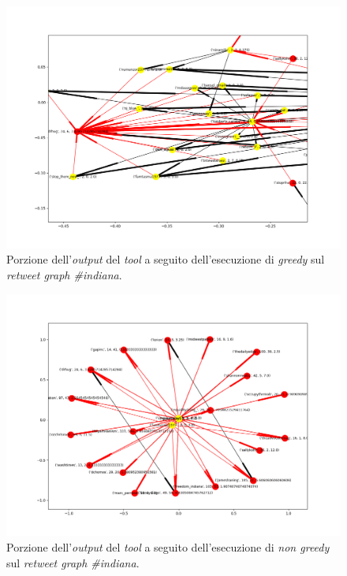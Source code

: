 \begin{figure}
\begin{center}
\includegraphics[scale=0.5]{images/indiana_in_degree_greedy_probability_free.png}
\end{center}
\caption{Porzione dell'\textit{output} del \textit{tool} a seguito dell'esecuzione di \textit{greedy} sul \textit{retweet graph \#indiana}.}
\label{fig:indigreedy}
\end{figure}

\begin{figure}
\begin{center}
\includegraphics[scale=0.5]{images/indiana_in_degree_probability_free.png}
\end{center}
\caption{Porzione dell'\textit{output} del \textit{tool} a seguito dell'esecuzione di \textit{non greedy} sul \textit{retweet graph \#indiana}.}
\label{fig:indinotgreedy}
\end{figure}

